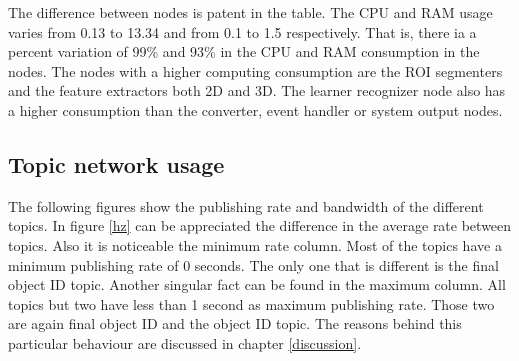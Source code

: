 			The difference between nodes is patent in the table.
			The CPU and RAM usage varies from  0.13 to 13.34 and from 0.1 to 1.5 respectively. 
			That is, there ia a percent variation of 99\% and  93\%  in the CPU and RAM consumption in the nodes. 
			The nodes with a higher computing consumption are the ROI segmenters and the feature extractors both 2D and 3D.
			The learner recognizer node also has a higher consumption than the converter, event handler or system output nodes. 
			

		\subsection{Topic network usage}
		\label{results_topics}

			The following figures show the publishing rate and bandwidth of the different topics. 
			In figure \ref{hz} can be appreciated the difference in the average rate between topics. 
			Also it is noticeable the minimum rate column. 
			Most of the topics have a minimum publishing rate of 0 seconds.
			The only one that is different is the final object ID topic. 
			Another singular fact can be found in the maximum column. 
			All topics but two have less than 1 second as maximum publishing rate. 
			Those two are again final object ID and the object ID topic. 
			The reasons behind this particular behaviour are discussed in chapter \ref{discussion}. 


